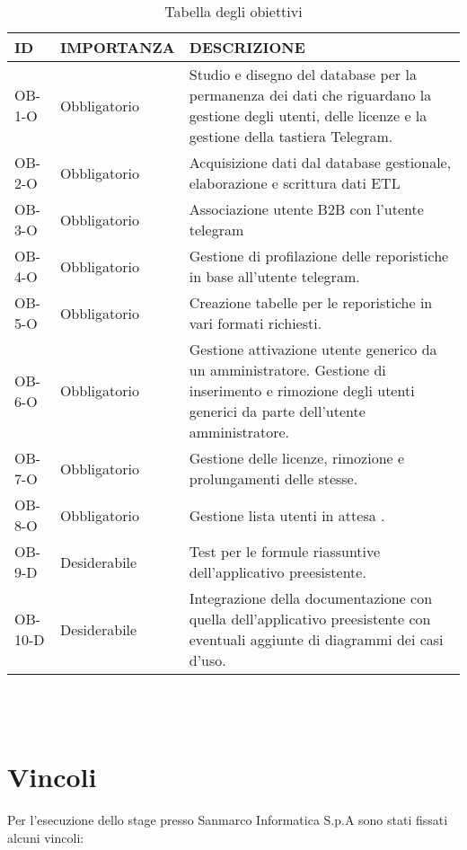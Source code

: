 \begin{table}

\begin{tabular}{ |p{2cm}|p{3cm}|p{8cm}| }
 \hline
\textbf{ ID}   &  \textbf{IMPORTANZA}    &  \textbf{DESCRIZIONE} \\ 

 \hline
  OB-1-O &  Obbligatorio   & Studio e disegno del database per la permanenza dei dati che riguardano la gestione degli utenti, delle licenze e la gestione della tastiera Telegram.\\
 \hline
OB-2-O &   Obbligatorio  &  Acquisizione dati dal database gestionale, elaborazione  e scrittura dati ETL \\
 \hline
 OB-3-O &   Obbligatorio  &  Associazione utente B2B con l'utente telegram \\
 \hline
 OB-4-O & Obbligatorio & Gestione di profilazione delle reporistiche in base all'utente telegram.\\
\hline
OB-5-O  & Obbligatorio & Creazione tabelle per le reporistiche in vari formati richiesti. \\
\hline
OB-6-O  &  Obbligatorio  & Gestione attivazione utente generico da un amministratore. Gestione di inserimento e rimozione degli utenti generici da parte dell'utente amministratore.\\
\hline  
OB-7-O & Obbligatorio & Gestione delle licenze, rimozione e prolungamenti delle stesse. \\
\hline
OB-8-O & Obbligatorio & Gestione lista utenti in attesa . \\
\hline
OB-9-D & Desiderabile & Test per le formule riassuntive dell'applicativo preesistente. \\
\hline
OB-10-D & Desiderabile & Integrazione della documentazione con quella  dell'applicativo preesistente con eventuali aggiunte di diagrammi dei casi d'uso. \\
\hline
\end{tabular}
\\\\
\caption{Tabella degli obiettivi}
\end{table}





\section{Vincoli}
Per l'esecuzione dello stage presso Sanmarco Informatica S.p.A sono stati fissati alcuni vincoli: \\\\

